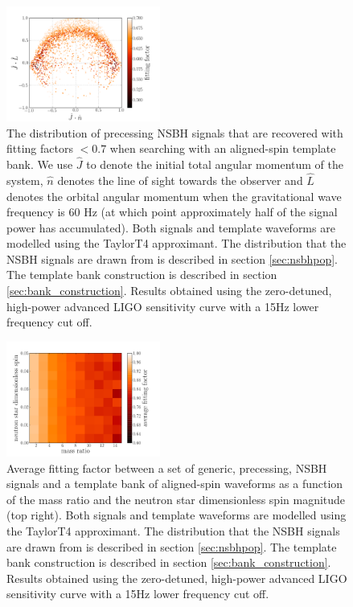 \begin{figure}
\includegraphics[width=0.45\textwidth]
{papers/nsbh_effectualness/figure12.pdf}
\caption{\label{fig:arseofsauron}
The distribution of precessing NSBH signals that are recovered with fitting
factors $< 0.7$ when searching with an aligned-spin template bank. We use
$\hat{J}$ to denote the initial total angular momentum of the system, $\hat{n}$
denotes the line of sight towards the observer
and $\hat{L}$ denotes the orbital angular momentum when the gravitational wave frequency is 60 Hz 
(at which point approximately half of the signal power has accumulated). 
Both signals and template waveforms are modelled using the TaylorT4 approximant.
The distribution that the NSBH signals are drawn from
is described in section \ref{sec:nsbhpop}. The template bank construction
is described in section \ref{sec:bank_construction}. Results obtained
using the zero-detuned, high-power advanced LIGO sensitivity curve with a 15Hz
lower frequency cut off.
}
\end{figure}

\begin{figure}
\includegraphics[width=0.45\textwidth]
{papers/nsbh_effectualness/figure13.pdf}
\caption{\label{fig:nsspin}
Average fitting factor between a set of generic, precessing, NSBH
signals and a template bank of aligned-spin waveforms as a function of the
mass ratio and the neutron star dimensionless spin
magnitude (top right). Both signals and
template waveforms are modelled using the TaylorT4 approximant.
The distribution that the NSBH signals are drawn from
is described in section \ref{sec:nsbhpop}. The template bank construction
is described in section \ref{sec:bank_construction}. Results obtained
using the zero-detuned, high-power advanced LIGO sensitivity curve with a 15Hz
lower frequency cut off.
}
\end{figure}


